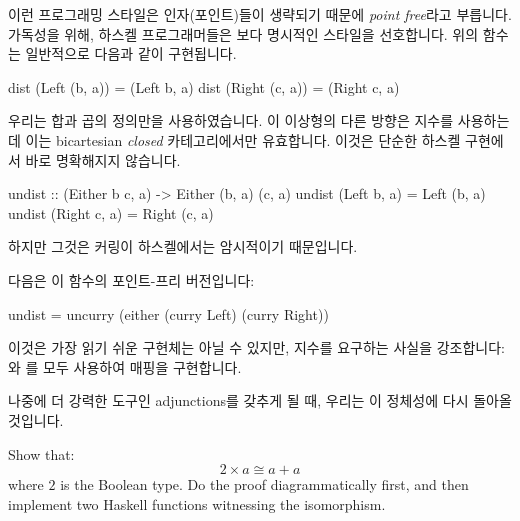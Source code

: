 \documentclass[DaoFP]{subfiles}
\begin{document}
이런 프로그래밍 스타일은 인자(포인트)들이 생략되기 때문에 \emph{point free}라고 부릅니다. 가독성을 위해, 하스켈 프로그래머들은 보다 명시적인 스타일을 선호합니다. 위의 함수는 일반적으로 다음과 같이 구현됩니다.
\begin{haskell}
dist (Left  (b, a)) = (Left  b, a)
dist (Right (c, a)) = (Right c, a)
\end{haskell}

우리는 합과 곱의 정의만을 사용하였습니다. 이 이상형의 다른 방향은 지수를 사용하는데 이는 bicartesian \emph{closed} 카테고리에서만 유효합니다. 이것은 단순한 하스켈 구현에서 바로 명확해지지 않습니다.
\begin{haskell}
undist :: (Either b c, a) -> Either (b, a) (c, a)
undist (Left b, a)  = Left (b, a)
undist (Right c, a) = Right (c, a)
\end{haskell}
하지만 그것은 커링이 하스켈에서는 암시적이기 때문입니다.

다음은 이 함수의 포인트-프리 버전입니다:
\begin{haskell}
undist = uncurry (either (curry Left) (curry Right))
\end{haskell}
이것은 가장 읽기 쉬운 구현체는 아닐 수 있지만, 지수를 요구하는 사실을 강조합니다: 와 를 모두 사용하여 매핑을 구현합니다.

나중에 더 강력한 도구인 adjunctions를 갖추게 될 때, 우리는 이 정체성에 다시 돌아올 것입니다.

\begin{exercise}
Show that:
\[ 2 \times a \cong a + a \]
where $2$ is the Boolean type. Do the proof diagrammatically first, and then implement two Haskell functions witnessing the isomorphism.
\end{exercise}
\end{document}
